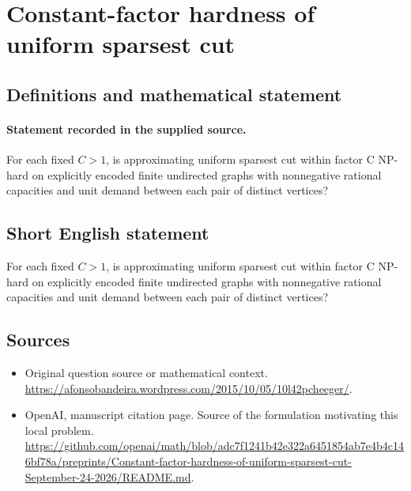 \documentclass[11pt]{article}
\begin{document}
\section*{Constant-factor hardness of uniform sparsest cut}\label{statement}
\subsection{Definitions and mathematical statement}
\paragraph{Statement recorded in the supplied source.}
For each fixed $C>1$, is approximating uniform sparsest cut within factor C NP-hard on explicitly encoded finite undirected graphs with nonnegative rational capacities and unit demand between each pair of distinct vertices?
\subsection{Short English statement}
For each fixed $C>1$, is approximating uniform sparsest cut within factor C NP-hard on explicitly encoded finite undirected graphs with nonnegative rational capacities and unit demand between each pair of distinct vertices?
\subsection{Sources}
\begin{itemize}
\item[S1] Original question source or mathematical context.
\url{https://afonsobandeira.wordpress.com/2015/10/05/10l42pcheeger/}.
\item[S2] OpenAI, manuscript citation page. Source of the formulation motivating this local problem.
\url{https://github.com/openai/math/blob/adc7f1241b42e322a6451854ab7e4b4c146bf78a/preprints/Constant-factor-hardness-of-uniform-sparsest-cut-September-24-2026/README.md}.
\end{itemize}
\end{document}
